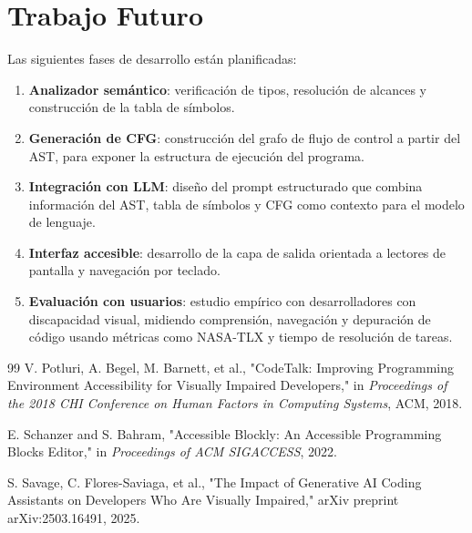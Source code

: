 \documentclass[conference]{IEEEtran}
\begin{document}
\section{Trabajo Futuro}
Las siguientes fases de desarrollo están planificadas:
\begin{enumerate}
    \item \textbf{Analizador semántico}: verificación de tipos, resolución de alcances y construcción de la tabla de símbolos.
    \item \textbf{Generación de CFG}: construcción del grafo de flujo de control a partir del AST, para exponer la estructura de ejecución del programa.
    \item \textbf{Integración con LLM}: diseño del prompt estructurado que combina información del AST, tabla de símbolos y CFG como contexto para el modelo de lenguaje.
    \item \textbf{Interfaz accesible}: desarrollo de la capa de salida orientada a lectores de pantalla y navegación por teclado.
    \item \textbf{Evaluación con usuarios}: estudio empírico con desarrolladores con discapacidad visual, midiendo comprensión, navegación y depuración de código usando métricas como NASA-TLX y tiempo de resolución de tareas.
\end{enumerate}



\begin{thebibliography}{99}
V. Potluri, A. Begel, M. Barnett, et al.,
"CodeTalk: Improving Programming Environment Accessibility for Visually Impaired Developers,"
in \textit{Proceedings of the 2018 CHI Conference on Human Factors in Computing Systems}, ACM, 2018.

E. Schanzer and S. Bahram,
"Accessible Blockly: An Accessible Programming Blocks Editor,"
in \textit{Proceedings of ACM SIGACCESS}, 2022.

S. Savage, C. Flores-Saviaga, et al.,
"The Impact of Generative AI Coding Assistants on Developers Who Are Visually Impaired,"
arXiv preprint arXiv:2503.16491, 2025.
\end{thebibliography}
\end{document}
